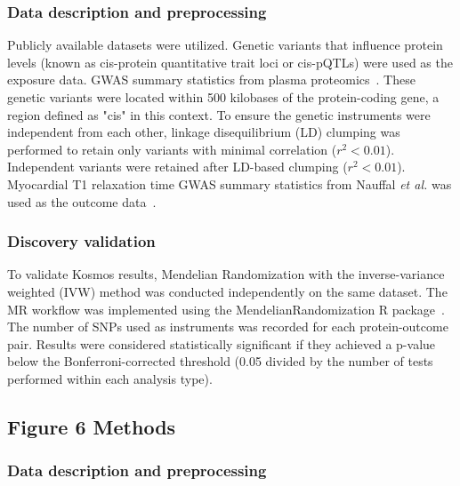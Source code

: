 \documentclass{article}
\begin{document}
\subsubsection{Data description and preprocessing}
Publicly available datasets were utilized. Genetic variants that influence protein levels (known as cis-protein quantitative trait loci or cis-pQTLs) were used as the exposure data. GWAS summary statistics from plasma proteomics~\cite{coetzee_motifbreakr_2024}. These genetic variants were located within 500 kilobases of the protein-coding gene, a region defined as "cis" in this context. To ensure the genetic instruments were independent from each other, linkage disequilibrium (LD) clumping was performed to retain only variants with minimal correlation ($r^2 < 0.01$). Independent variants were retained after LD-based clumping ($r^2 < 0.01$). Myocardial T1 relaxation time GWAS summary statistics from Nauffal \textit{et al.} was used as the outcome data~\cite{nauffal_genetics_2023}.

\subsubsection{Discovery validation}

To validate Kosmos results, Mendelian Randomization with the inverse-variance weighted (IVW) method was conducted independently on the same dataset. The MR workflow was implemented using the MendelianRandomization R package~\cite{yavorska_mendelianrandomization_2017}. The number of SNPs used as instruments was recorded for each protein-outcome pair. Results were considered statistically significant if they achieved a p-value below the Bonferroni-corrected threshold (0.05 divided by the number of tests performed within each analysis type).


\subsection{Figure 6 Methods}

\subsubsection{Data description and preprocessing}
\end{document}
